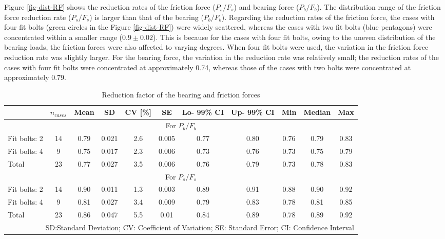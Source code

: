 Figure \ref{fig-dist-RF} shows the reduction rates of the friction force ($P_s/F_s$) and bearing force ($P_b/F_b$). The distribution range of the friction force reduction rate ($P_s/F_s$) is larger than that of the bearing ($P_b/F_b$). Regarding the reduction rates of the friction force, the cases with four fit bolts (green circles in the Figure \ref{fig-dist-RF}) were widely scattered, whereas the cases with two fit bolts (blue pentagons) were concentrated within a smaller range ($0.9 \pm 0.02$). This is because for the cases with four fit bolts, owing to the uneven distribution of the bearing loads, the friction forces were also affected to varying degrees. When four fit bolts were used, the variation in the friction force reduction rate was slightly larger. For the bearing force, the variation in the reduction rate was relatively small; the reduction rates of the cases with four fit bolts were concentrated at approximately 0.74, whereas those of the cases with two bolts were concentrated at approximately 0.79.

\begin{table}[htbp]
    \small
    \centering
    \caption{Reduction factor of the bearing and friction forces}
    \begin{tabularx}{\textwidth}{@{}lcccccccccc@{}}
    \toprule
     & $n_{cases}$ & Mean & SD  & CV [\%] & SE & Lo- 99\% CI & Up- 99\% CI & Min & Median & Max \\ \midrule
     \multicolumn{11}{c}{For $P_b/F_b$}\\
     Fit bolts: 2 & 14 & 0.79 & 0.021 & 2.6 & 0.005 & 0.77 & 0.80 & 0.76 & 0.79 & 0.83 \\
     Fit bolts: 4 & 9  & 0.75 & 0.017 & 2.3 & 0.006 & 0.73 & 0.76 & 0.73 & 0.75 & 0.79 \\ 
     Total        & 23 & 0.77 & 0.027 & 3.5 & 0.006 & 0.76 & 0.79 & 0.73 & 0.78 & 0.83 \\\midrule
     \multicolumn{11}{c}{For $P_s/F_s$}\\
     Fit bolts: 2 & 14 & 0.90 & 0.011 & 1.3 & 0.003 & 0.89 & 0.91 & 0.88 & 0.90 & 0.92 \\
     Fit bolts: 4 & 9  & 0.81 & 0.027 & 3.4 & 0.009 & 0.79 & 0.83 & 0.78 & 0.81 & 0.85 \\
    Total         & 23 &0.86 & 0.047 & 5.5 &0.01 &0.84 &0.89 &0.78 &0.89 &0.92 \\
     \bottomrule 
     \multicolumn{11}{r}{SD:Standard Deviation; CV: Coefficient of Variation; SE: Standard Error; CI: Confidence Interval} \\ 
    \end{tabularx}
    \label{tab-rdfactor}
\end{table}

